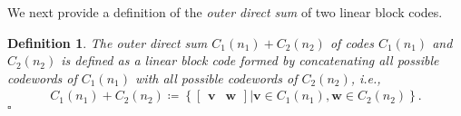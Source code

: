 \documentclass[10pt,journal]{IEEEtran}
\newtheorem{definition}{Definition}
\begin{document}
We next provide a definition of the \textit{outer direct sum} of two linear block codes.
\begin{definition}
\label{Definition_outer_direct_sum} 
The outer direct sum $C_1(n_1) + C_2(n_2)$ of codes $C_1(n_1)$ and $C_2(n_2)$ 
is defined as a linear block code formed by concatenating all possible codewords of $C_1(n_1)$ with 
all possible codewords of $C_2(n_2)$, i.e.,
% 
\begin{align*}
% 
C_1(n_1) + C_2(n_2) \coloneqq \left\{\begin{bmatrix} \mathbf{v}  & \mathbf{w} \end{bmatrix} \bigg| \mathbf{v} \in C_1(n_1), \mathbf{w} \in C_2(n_2) \right\}. 
% 
\end{align*}
% 
\hfill $\square$
% 
\end{definition}
% 
\end{document}
